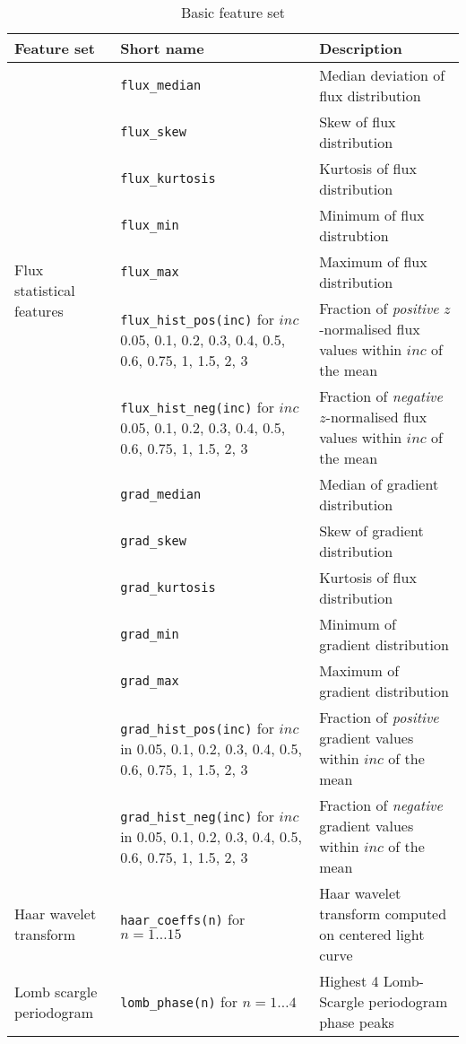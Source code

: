 	\begin{table}[ht!]
	\centering
		\label{tab:features}
	
		\begin{tabular}{|l|p{}|p{}|} \hline
		\textbf{Feature set} & \textbf{Short name} & \textbf{Description}\\ \hline
		\multirow{8}{*}{Flux statistical features}
		& \verb#flux_median# & Median deviation of flux distribution \\ \cline{2-3}
		& \verb#flux_skew# & Skew of flux distribution \\ \cline{2-3}
		& \verb#flux_kurtosis# & Kurtosis of flux distribution \\ \cline{2-3}
		& \verb#flux_min# & Minimum of flux distrubtion \\ \cline{2-3} %
		& \verb#flux_max# & Maximum of flux distribution \\ \cline{2-3}
		& \verb#flux_hist_pos(inc)#  for $inc$ 0.05, 0.1, 0.2, 0.3, 0.4, 0.5, 0.6, 0.75, 1, 1.5, 2, 3 & Fraction of \emph{positive} $z$-normalised flux values within $inc$ of the mean  \\ \cline{2-3}
		& \verb#flux_hist_neg(inc)# for $inc$ 0.05, 0.1, 0.2, 0.3, 0.4, 0.5, 0.6, 0.75, 1, 1.5, 2, 3 & Fraction of \emph{negative} $z$-normalised flux values within $inc$ of the mean  \\
		\hline
	\multirow{8}{*}{Segmentation statistical features}
		& \verb#grad_median# & Median of gradient distribution \\ \cline{2-3}
		& \verb#grad_skew# & Skew of gradient distribution \\ \cline{2-3}
		& \verb#grad_kurtosis# & Kurtosis of flux distribution \\ \cline{2-3}
		& \verb#grad_min# & Minimum of gradient distribution \\ \cline{2-3} %
		& \verb#grad_max# & Maximum of gradient distribution \\ \cline{2-3}
		& \verb#grad_hist_pos(inc)#  for $inc$ in 0.05, 0.1, 0.2, 0.3, 0.4, 0.5, 0.6, 0.75, 1, 1.5, 2, 3 & Fraction of \emph{positive} gradient values within $inc$ of the mean  \\ \cline{2-3}
		& \verb#grad_hist_neg(inc)# for $inc$ in 0.05, 0.1, 0.2, 0.3, 0.4, 0.5, 0.6, 0.75, 1, 1.5, 2, 3 & Fraction of \emph{negative} gradient values within $inc$ of the mean  \\
		\hline
		\multirow{1}{*}{Haar wavelet transform} & \verb#haar_coeffs(n)# for $n = 1 \ldots 15$ & Haar wavelet transform computed on centered light curve \\
		\hline
		\multirow{1}{*}{Lomb scargle periodogram} & \verb#lomb_phase(n)# for $n = 1 \ldots 4$ & Highest 4 Lomb-Scargle periodogram phase peaks \\ \hline
		\end{tabular}
		\caption{Basic feature set}
	\end{table}	

